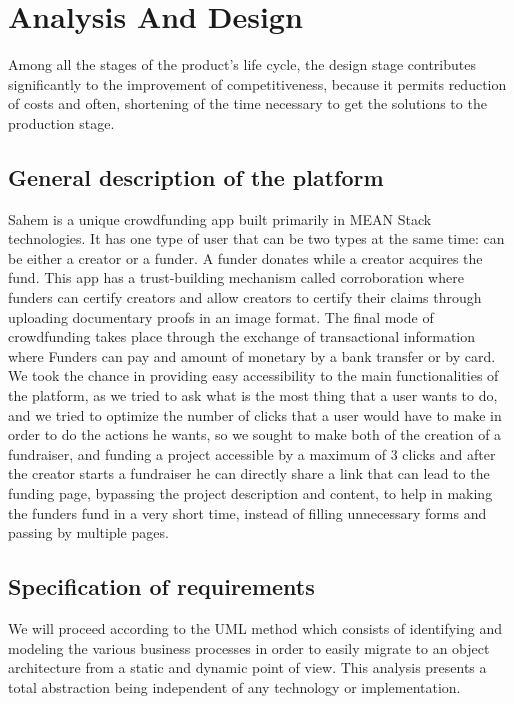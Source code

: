 

\setcounter{mtc}{9}
\chapter{Analysis And Design}%
\label{chap:chapter_two}
\minitoc
Among all the stages of the product's life cycle, the design stage contributes significantly to the improvement of competitiveness, because it permits reduction of costs and often, shortening of the time necessary to get the solutions to the production stage.

\section{General description of the platform}
Sahem is a unique crowdfunding app built primarily in MEAN Stack technologies. It has one type of user that can be two types at the same time: can be either a creator or a funder. A funder donates while a creator acquires the fund. This app has a trust-building mechanism called corroboration where funders can certify creators and allow creators to certify their claims through uploading documentary proofs in an image format. The final mode of crowdfunding takes place through the exchange of transactional information where Funders can pay and amount of monetary by a bank transfer or by card.
We took the chance in providing easy accessibility to the main functionalities of the platform, as we tried to ask what is the most thing that a user wants to do, and we tried to optimize the number of clicks that a user would have to make in order to do the actions he wants, so we sought to make both of the creation of a fundraiser, and funding a project accessible by a maximum of 3 clicks and after the creator starts a fundraiser he can directly share a link that can lead to the funding page, bypassing the project description and content, to help in making the funders fund in a very short time, instead of filling unnecessary forms and passing by multiple pages.

\section{Specification of requirements}
We will proceed according to the UML method which consists of identifying and modeling the various business processes in order to easily migrate to an object architecture from a static and dynamic point of view. This analysis presents a total abstraction being independent of any technology or implementation.

